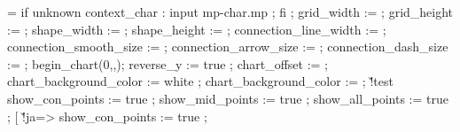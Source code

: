 {   \edef\@@FLOLlijndikte{\the\scratchdimen}%
   \ifdim\@@FLOLstraal<2.5\scratchdimen
     \scratchdimen=2.5\scratchdimen
     \edef\@@FLOLstraal{\the\scratchdimen}%
     \ifdim\@@FLOLstraal>\@@FLOWdx
       \scratchdimen=\@@FLOWdx
       \edef\@@FLOLstraal{\the\scratchdimen}%
     \fi
     \ifdim\@@FLOLstraal>\@@FLOWdy
       \scratchdimen=\@@FLOWdy
       \edef\@@FLOLstraal{\the\scratchdimen}%
     \fi
   \else
     \scratchdimen=\@@FLOLstraal
     \edef\@@FLOLstraal{\the\scratchdimen}%
   \fi
   \processaction %
     [\@@FLOWoffset]
     [      \v!geen=>\scratchdimen=-2.5\scratchdimen,
         \v!overlay=>\scratchdimen=-2.5\scratchdimen,
       \v!standaard=>\scratchdimen=\scratchdimen,
         \s!unknown=>\scratchdimen=\@@FLOWoffset,
         \s!default=>\scratchdimen=-2.5\scratchdimen]%
   \edef\@@FLOW@@offset{\the\scratchdimen}%
   \forgetall
   \offinterlineskip
   \resetMPdrawing
   \doglobal\newcounter\FLOWcomment
   \startMPdrawing
     if unknown context_char : input mp-char.mp ; fi ;
     grid_width             := \FLOWgridwidth ;
     grid_height            := \FLOWgridheight ;
     shape_width            := \FLOWshapewidth ;
     shape_height           := \FLOWshapeheight ;
     connection_line_width  := \@@FLOLlijndikte ;
     connection_smooth_size := \@@FLOLstraal ;
     connection_arrow_size  := \@@FLOLstraal ;
     connection_dash_size   := \@@FLOLstraal ;
     begin_chart(0,\FLOWwidth,\FLOWheight);
     reverse_y := true ;
     chart_offset := \@@FLOW@@offset ;
   \stopMPdrawing
   \doifelsenothing\@@FLOWachtergrondkleur
     {\startMPdrawing
      chart_background_color := white ;
      \stopMPdrawing}
     {\startMPdrawing
      chart_background_color := \MPcolor{\@@FLOWachtergrondkleur} ;
      \stopMPdrawing}%
   \doif\@@FLOWoptie\v!test
     {\startMPdrawing
        show_con_points := true ;
        show_mid_points := true ;
        show_all_points := true ;
      \stopMPdrawing}%
   \processaction %
     [\@@FLOWpunt]
     [     \v!ja=>\startMPdrawing
                    show_con_points := true ;
}
